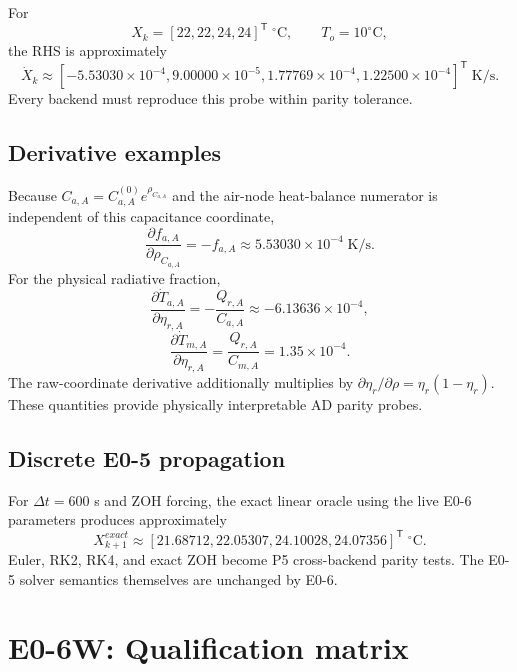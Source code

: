 \documentclass[11pt]{article}
\begin{document}
For
\[
X_k=[22,22,24,24]^{\mathsf T}\;^\circ\mathrm C,
\qquad T_o=10^\circ\mathrm C,
\]
the RHS is approximately
\[
\boxed{
\dot X_k\approx
[-5.53030\times10^{-4},
9.00000\times10^{-5},
1.77769\times10^{-4},
1.22500\times10^{-4}]^{\mathsf T}\;\text{K/s}.
}
\]
Every backend must reproduce this probe within parity tolerance.

\subsection{Derivative examples}
Because $C_{a,A}=C_{a,A}^{(0)}e^{\rho_{C_{a,A}}}$ and the air-node heat-balance
numerator is independent of this capacitance coordinate,
\[
\boxed{
\frac{\partial f_{a,A}}{\partial\rho_{C_{a,A}}}=-f_{a,A}
\approx5.53030\times10^{-4}\;\text{K/s}.
}
\]
For the physical radiative fraction,
\[
\frac{\partial \dot T_{a,A}}{\partial\eta_{r,A}}
=-\frac{Q_{r,A}}{C_{a,A}}
\approx-6.13636\times10^{-4},
\]
\[
\frac{\partial \dot T_{m,A}}{\partial\eta_{r,A}}
=\frac{Q_{r,A}}{C_{m,A}}
=1.35\times10^{-4}.
\]
The raw-coordinate derivative additionally multiplies by
$\partial\eta_r/\partial\rho=\eta_r(1-\eta_r)$.
These quantities provide physically interpretable AD parity probes.

\subsection{Discrete E0-5 propagation}
For $\Delta t=600$ s and ZOH forcing, the exact linear oracle using the live
E0-6 parameters produces approximately
\[
\boxed{
X_{k+1}^{exact}\approx
[21.68712,22.05307,24.10028,24.07356]^{\mathsf T}\;^\circ\mathrm C.
}
\]
Euler, RK2, RK4, and exact ZOH become P5 cross-backend parity tests. The E0-5
solver semantics themselves are unchanged by E0-6.

\section{E0-6W: Qualification matrix}
\end{document}
